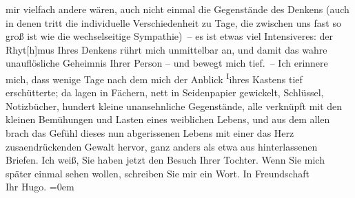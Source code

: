 \begin{ledgroupsized}[t]{13cm}
               mir vielfach andere wären, auch nicht einmal die Gegenstände des Denkens (auch in
               denen tritt die individuelle Verschiedenheit zu Tage, die zwischen uns fast so groß
               ist wie die wechselseitige Sympathie) – {\pb}es ist etwas viel Intensiveres:
               der Rhyt{[}h{]}mus Ihres Denkens rührt mich unmittelbar an, und damit
               das wahre unauflösliche Geheimnis Ihrer Person – und bewegt mich tief. – Ich erinnere
               mich, dass wenige Tage nach dem \label{K_L02496-1v}\label{K_L02496-1h} mich der Anblick \substVorne{}\textsuperscript{I}\substDazwischen{}i\substHinten{}hres Kastens tief erschütterte; da lagen in Fächern, nett in Seidenpapier
               gewickelt, Schlüssel, Notizbücher, hundert kleine unansehnliche Gegenstände, alle
               verknüpft mit den kleinen Bemühungen und Lasten eines weiblichen Lebens, und aus dem
               allen brach das Gefühl dieses nun abgerissenen Lebens mit einer das Herz zusa{\geminationm}endrückenden Gewalt hervor, ganz anders als etwa aus
               hinterlassenen Briefen.\pend
           \pstart
           Ich weiß, Sie haben jetzt den Besuch Ihrer Tochter. Wenn Sie mich später einmal sehen wollen,
               schreiben Sie mir ein Wort.\pend
           \pstart
           In Freundschaft{\\[\baselineskip]}Ihr \spacefill\mbox{Hugo.}\pend
           \leftskip=0em{}
         
         \endnumbering{}\end{ledgroupsized}  \newcommand{\dateiname}{L02496}\newcommand{\titel}{Hugo Hofmannsthal an Arthur Schnitzler, 29. 12. 1927}\newcommand{\editorInnen}{Martin Anton Müller und Gerd-Hermann Susen}
      